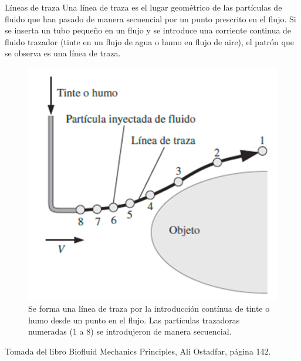 \begin{frame}{Líneas de traza}
\justifying
Una línea de traza es el lugar geométrico de las partículas de fluido que han pasado de manera secuencial por un punto prescrito en el flujo.
Si se inserta un tubo pequeño en un flujo y se introduce una corriente continua de fluido trazador (tinte en un flujo de agua o humo en flujo de aire), el patrón que se observa es una línea de traza.
\begin{figure}[H]
\centering
\includegraphics[scale=0.3]{Section_Files/picmanuel/11.png}
\caption{Se forma una línea de traza por la introducción contínua de tinte o humo desde un punto en el flujo. Las partículas trazadoras numeradas (1 a 8) se introdujeron de manera secuencial.}
\label{fig: Figura2-Fig0403-06}
\end{figure}	
{\tiny Tomada del libro Biofluid Mechanics Principles, Ali Ostadfar, página 142.}
\end{frame}

